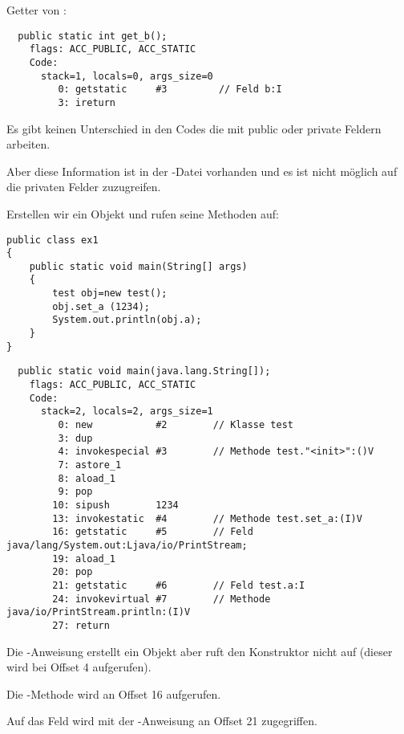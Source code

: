 Getter von :

\begin{lstlisting}
  public static int get_b();
    flags: ACC_PUBLIC, ACC_STATIC
    Code:
      stack=1, locals=0, args_size=0
         0: getstatic     #3         // Feld b:I
         3: ireturn       
\end{lstlisting}

Es gibt keinen Unterschied in den Codes die mit public oder private Feldern arbeiten.

Aber diese Information ist in der -Datei vorhanden und es ist nicht
möglich auf die privaten Felder zuzugreifen.

Erstellen wir ein Objekt und rufen seine Methoden auf:

\begin{lstlisting}[caption=ex1.java,style=customjava]
public class ex1
{
	public static void main(String[] args)
	{
		test obj=new test();
		obj.set_a (1234);
		System.out.println(obj.a);
	}
}
\end{lstlisting}

\begin{lstlisting}
  public static void main(java.lang.String[]);
    flags: ACC_PUBLIC, ACC_STATIC
    Code:
      stack=2, locals=2, args_size=1
         0: new           #2        // Klasse test
         3: dup           
         4: invokespecial #3        // Methode test."<init>":()V
         7: astore_1      
         8: aload_1       
         9: pop           
        10: sipush        1234
        13: invokestatic  #4        // Methode test.set_a:(I)V
        16: getstatic     #5        // Feld java/lang/System.out:Ljava/io/PrintStream;
        19: aload_1       
        20: pop           
        21: getstatic     #6        // Feld test.a:I
        24: invokevirtual #7        // Methode java/io/PrintStream.println:(I)V
        27: return        
\end{lstlisting}

Die -Anweisung erstellt ein Objekt aber ruft den Konstruktor nicht auf
(dieser wird bei Offset 4 aufgerufen).

Die -Methode wird an Offset 16 aufgerufen.

Auf das Feld  wird mit der -Anweisung an Offset 21 zugegriffen.
